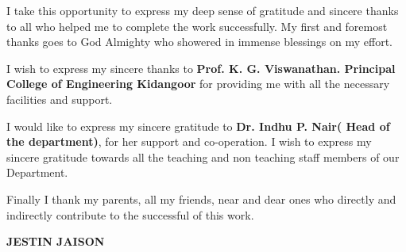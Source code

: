 \documentclass[12pt,a4paper]{report}
\begin{document}
I take this opportunity to express my deep sense of gratitude and sincere thanks to all who helped me to complete the work successfully. My first and foremost thanks goes to God Almighty who showered in immense blessings on my effort.

 I wish to express my sincere thanks to \textbf{ Prof. K. G. Viswanathan. Principal College of Engineering Kidangoor} for providing  me with all the necessary facilities and support.
 
 I would like to express my sincere gratitude to \textbf{Dr. Indhu P. Nair( Head of the department)}, for her support and co-operation. 
 I wish to express my sincere gratitude towards all the teaching and non teaching staff members of our Department.
 
 Finally I thank my parents, all my friends, near and dear ones who directly and indirectly contribute to the successful of this work.




\begin{flushright}
\textbf{JESTIN JAISON}
\end{flushright}
\thispagestyle{empty}
\end{document}
